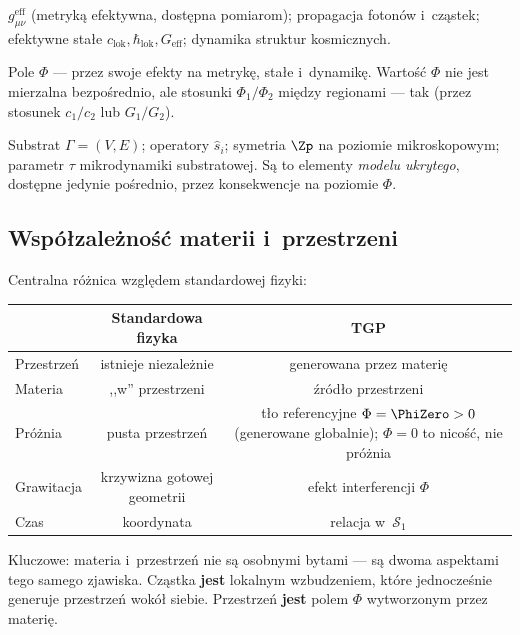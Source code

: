 \begin{remark}\label{rem:obserwowalne}
\begin{description}[style=nextline, nosep]
  \item[\textbf{Obserwowalne bezpo\'srednio}:]
    $g_{\mu\nu}^{\mathrm{eff}}$ (metryk\k{a} efektywna, dost\k{e}pna
    pomiarom); propagacja foton\'ow i~cz\k{a}stek;
    efektywne sta\l{}e $c_{\mathrm{lok}}, \hbar_{\mathrm{lok}},
    G_{\mathrm{eff}}$; dynamika struktur kosmicznych.
  \item[\textbf{Obserwowalne po\'srednio}:]
    Pole $\Phi$ --- przez swoje efekty na metryk\k{e},
    sta\l{}e i~dynamik\k{e}. Warto\'s\'c $\Phi$ nie jest
    mierzalna bezpo\'srednio, ale stosunki $\Phi_1/\Phi_2$
    mi\k{e}dzy regionami --- tak (przez stosunek $c_1/c_2$
    lub $G_1/G_2$).
  \item[\textbf{Nieobserwowalne bezpo\'srednio}:]
    Substrat $\Gamma = (V, E)$; operatory $\hat{s}_i$;
    symetria $\Zp$ na poziomie mikroskopowym;
    parametr $\tau$ mikrodynamiki substratowej.
    S\k{a} to elementy \emph{modelu ukrytego}, dost\k{e}pne
    jedynie po\'srednio, przez konsekwencje na poziomie $\Phi$.
\end{description}
\end{remark}

\subsection{Wsp\'o\l{}zale\.zno\'s\'c materii i~przestrzeni}\label{ssec:wspolzaleznosc}

Centralna r\'o\.znica wzgl\k{e}dem standardowej fizyki:

\begin{center}
\begin{tabular}{lcc}
\toprule
& \textbf{Standardowa fizyka} & \textbf{TGP} \\
\midrule
Przestrze\'n & istnieje niezale\.znie & generowana przez materi\k{e} \\
Materia & ,,w'' przestrzeni & \'zr\'od\l{}o przestrzeni \\
Pr\'o\.znia & pusta przestrze\'n & t\l{}o referencyjne $\Phi = \PhiZero > 0$
  (generowane globalnie); $\Phi = 0$ to nico\'s\'c, nie pr\'o\.znia \\
Grawitacja & krzywizna gotowej geometrii & efekt interferencji $\Phi$ \\
Czas & koordynata & relacja w~$\mathcal{S}_1$ \\
\bottomrule
\end{tabular}
\end{center}

Kluczowe: materia i~przestrze\'n nie s\k{a} osobnymi bytami ---
s\k{a} dwoma aspektami tego samego zjawiska. Cz\k{a}stka
\textbf{jest} lokalnym wzbudzeniem, kt\'ore jednocze\'snie
generuje przestrze\'n wok\'o\l{} siebie. Przestrze\'n \textbf{jest}
polem $\Phi$ wytworzonym przez materi\k{e}.
